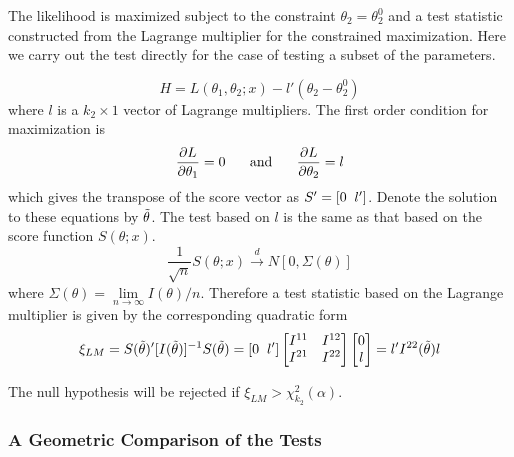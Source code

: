 \documentclass{article}
\begin{document}
The likelihood is maximized subject to the constraint \(\theta_2=\theta_2^0\) and a test statistic constructed from the Lagrange multiplier for the constrained maximization. Here we carry out the test directly for the case of testing a subset of the parameters.

\begin{equation*}
    H=L(\theta_1,\theta_2;x)-l'(\theta_2-\theta_2^0)
\end{equation*}
where $l$ is a \(k_2 \times 1\) vector of Lagrange multipliers. The first order condition for maximization is
\begin{equation*}
    \frac{\partial L}{\partial \theta_1} = 0 \hspace{0.5cm} \text{ and } \hspace{0.5cm} \frac{\partial L}{\partial \theta_2}=l
\end{equation*}
which gives the transpose of the score vector as \(S'=[0 \hspace{0.2cm} l']\). Denote the solution to these equations by \(\Tilde{\theta}\). The test based on $l$ is the same as that based on the score function \(S(\theta;x)\).
\begin{equation*}
    \frac{1}{\sqrt{n}}S(\theta;x) \stackrel{d} \longrightarrow N[0,\Sigma(\theta)]
\end{equation*}
where \(\Sigma(\theta)=\lim\limits_{n \rightarrow \infty} I(\theta)/n\). Therefore a test statistic based on the Lagrange multiplier is given by the corresponding quadratic form
\begin{equation*}
    \xi_{LM}=S(\Tilde{\theta})'[I(\Tilde{\theta})]^{-1}S(\Tilde{\theta})=[0 \hspace{0.2cm} l'] \begin{bmatrix}
        I^{11} & I^{12} \\
        I^{21} & I^{22}
    \end{bmatrix} \begin{bmatrix}
        0\\
        l
    \end{bmatrix} = l'I^{22}(\Tilde{\theta})l
\end{equation*}

The null hypothesis will be rejected if \(\xi_{LM}>\chi_{k_2}^2(\alpha)\).

\subsubsection{A Geometric Comparison of the Tests}
\end{document}
